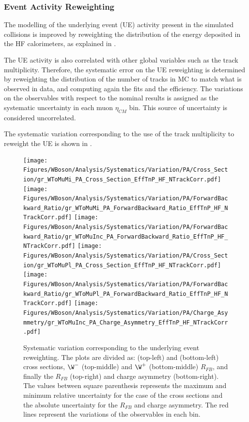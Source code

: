 \clearpage
\subsubsection{Event Activity Reweighting}

The modelling of the underlying event (UE) activity present in the simulated \pPb collisions is improved by reweighting the distribution of the energy deposited in the HF calorimeters, as explained in .

The UE activity is also correlated with other global variables such as the track multiplicity. Therefore, the systematic error on the UE reweighting is determined by reweighting the distribution of the number of tracks in MC to match what is observed in data, and computing again the fits and the efficiency. The variations on the observables with respect to the nominal results is assigned as the systematic uncertainty in each muon $\eta_{CM}$ bin. This source of uncertainty is considered uncorrelated.

The systematic variation corresponding to the use of the track multiplicity to reweight the UE is shown in .

\begin{figure}[htbp]
 \begin{center}
  \texttt{[image: Figures/WBoson/Analysis/Systematics/Variation/PA/Cross\_Section/gr\_WToMuMi\_PA\_Cross\_Section\_EffTnP\_HF\_NTrackCorr.pdf]}
  \texttt{[image: Figures/WBoson/Analysis/Systematics/Variation/PA/ForwardBackward\_Ratio/gr\_WToMuMi\_PA\_ForwardBackward\_Ratio\_EffTnP\_HF\_NTrackCorr.pdf]}
  \texttt{[image: Figures/WBoson/Analysis/Systematics/Variation/PA/ForwardBackward\_Ratio/gr\_WToMuInc\_PA\_ForwardBackward\_Ratio\_EffTnP\_HF\_NTrackCorr.pdf]}
  \texttt{[image: Figures/WBoson/Analysis/Systematics/Variation/PA/Cross\_Section/gr\_WToMuPl\_PA\_Cross\_Section\_EffTnP\_HF\_NTrackCorr.pdf]}
  \texttt{[image: Figures/WBoson/Analysis/Systematics/Variation/PA/ForwardBackward\_Ratio/gr\_WToMuPl\_PA\_ForwardBackward\_Ratio\_EffTnP\_HF\_NTrackCorr.pdf]}
  \texttt{[image: Figures/WBoson/Analysis/Systematics/Variation/PA/Charge\_Asymmetry/gr\_WToMuInc\_PA\_Charge\_Asymmetry\_EffTnP\_HF\_NTrackCorr.pdf]}
 \end{center}
 \caption{Systematic variation corresponding to the underlying event reweighting. The plots are divided as: \WToMuNuMi (top-left) and \WToMuNuPl (bottom-left) cross sections, $\W^{-}$ (top-middle) and $\W^{+}$ (bottom-middle) $R_{FB}$, and finally the \W $R_{FB}$ (top-right) and \W charge asymmetry (bottom-right). The values between square parenthesis represents the maximum and minimum relative uncertainty for the case of the cross sections and the absolute uncertainty for the $R_{FB}$ and charge asymmetry. The red lines represent the variations of the observables in each bin.}
 \label{fig:Systematic_NTrack}
\end{figure}


